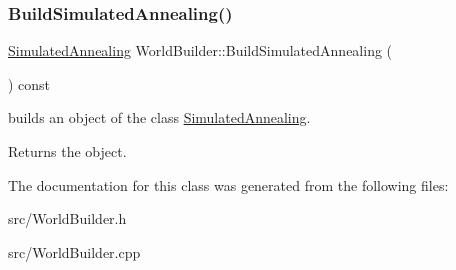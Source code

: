 \subsubsection{\texorpdfstring{Build\+Simulated\+Annealing()}{BuildSimulatedAnnealing()}}
{\footnotesize\ttfamily \hyperlink{classSimulatedAnnealing}{Simulated\+Annealing} World\+Builder\+::\+Build\+Simulated\+Annealing (\begin{DoxyParamCaption}{ }\end{DoxyParamCaption}) const}



builds an object of the class \hyperlink{classSimulatedAnnealing}{Simulated\+Annealing}. 

\begin{DoxyReturn}{Returns}
the object. 
\end{DoxyReturn}


The documentation for this class was generated from the following files\+:\begin{DoxyCompactItemize}
\item 
src/World\+Builder.\+h\item 
src/World\+Builder.\+cpp\end{DoxyCompactItemize}
